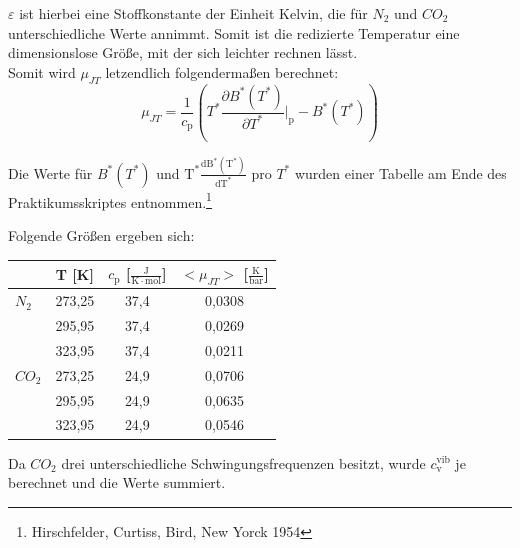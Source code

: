 \documentclass[12pt,a4paper,titlepage,headinclude,bibtotoc]{scrartcl}
\begin{document}
$\varepsilon$ ist hierbei eine Stoffkonstante der Einheit Kelvin, die für $N_\mathrm{2}$ und $CO_\mathrm{2}$ unterschiedliche Werte annimmt. Somit ist die redizierte Temperatur eine dimensionslose Größe, mit der sich leichter rechnen lässt.\\ 
Somit wird $\mu_{JT}$ letzendlich folgendermaßen berechnet:\\

\begin{equation}
\mu_{JT} = \frac{1}{c_\mathrm{p}}\left( T^* \frac{\partial B^*(T^*)}{\partial T^*} \bigg \vert_\mathrm{p} - B^*(T^*)\right)
\end{equation}

Die Werte für $B^*(T^*)$ und $\mathrm{T^*}\frac{\mathrm{dB^*(T^*)}}{\mathrm{dT^*}}$ pro $T^*$ wurden einer Tabelle am Ende des Praktikumsskriptes entnommen.\protect\footnote{Hirschfelder, Curtiss, Bird, New Yorck 1954}

Folgende Größen ergeben sich:\\

\begin{table} [h]
\begin{tabular} {l | c|  c | c}
	 &  T [K] &  $c_\mathrm{p}$ [$\frac{\mathrm{J}}{\mathrm{K}\cdot \mathrm{mol}}$] & $ <\mu_{JT}>$ [$\frac{\mathrm{K}}{\mathrm{bar}}$] \\
	 \hline
	  $N_\mathrm{2}$ & 273,25 & 37,4 & 0,0308 \\
	   & 295,95 & 37,4 &0,0269 \\
	  & 323,95 & 37,4 & 0,0211\\
	\hline
	$CO_\mathrm{2}$ & 273,25& 24,9  &  0,0706\\
	& 295,95 & 24,9  &0,0635 \\
	& 323,95& 24,9 & 0,0546\\
\end{tabular}
\end{table}

Da $CO_2$ drei unterschiedliche Schwingungsfrequenzen besitzt, wurde $c_\mathrm{v}^\mathrm{ vib}$ je berechnet und die Werte summiert.\\




\end{document}

